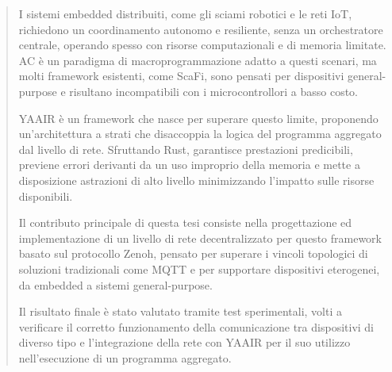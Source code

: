 \begin{abstract}
I sistemi embedded distribuiti, come gli sciami robotici e le reti \ac{IoT},
richiedono un coordinamento autonomo e resiliente, senza un orchestratore
centrale, operando spesso con risorse computazionali e di memoria limitate.
\ac{AC} è un paradigma di macroprogrammazione adatto a questi scenari, ma molti
framework esistenti, come \ac{ScaFi}, sono pensati per dispositivi general-purpose e
risultano incompatibili con i microcontrollori a basso costo.

\ac{YAAIR} è un framework che nasce per superare questo limite, proponendo
un'architettura a strati che disaccoppia la logica del programma aggregato dal
livello di rete. Sfruttando Rust, garantisce prestazioni predicibili, previene
errori derivanti da un uso improprio della memoria e mette a disposizione astrazioni
di alto livello minimizzando l'impatto sulle risorse disponibili.

Il contributo principale di questa tesi consiste nella progettazione ed implementazione
di un livello di rete decentralizzato per questo framework basato sul protocollo Zenoh,
pensato per superare i vincoli topologici di soluzioni tradizionali come \ac{MQTT}
e per supportare dispositivi eterogenei, da embedded a sistemi general-purpose.

Il risultato finale è stato valutato tramite test sperimentali, volti a verificare
il corretto funzionamento della comunicazione tra dispositivi di diverso tipo e
l'integrazione della rete con \ac{YAAIR} per il suo utilizzo nell'esecuzione di
un programma aggregato.
\end{abstract}
